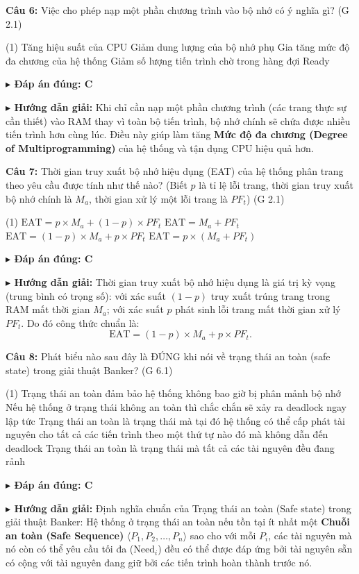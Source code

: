 \documentclass[11pt,a4paper]{article}
\newcommand{\giaithich}[2]{%
    \par\vspace{0.15cm}\noindent
    \begingroup\small
    \noindent\textbf{\color{blue}$\blacktriangleright$ Đáp án đúng: #1} \par\vspace{0.08cm}
    \noindent\textbf{\color{teal}$\blacktriangleright$ Hướng dẫn giải:} #2
    \endgroup\par\vspace{0.35cm}
}
\begin{document}
\noindent\textbf{Câu 6:} Việc cho phép nạp một phần chương trình vào bộ nhớ có ý nghĩa gì? (G 2.1)
\begin{tasks}(1)
    \task Tăng hiệu suất của CPU
    \task Giảm dung lượng của bộ nhớ phụ
    \task Gia tăng mức độ đa chương của hệ thống
    \task Giảm số lượng tiến trình chờ trong hàng đợi Ready
\end{tasks}
\giaithich{C}{Khi chỉ cần nạp một phần chương trình (các trang thực sự cần thiết) vào RAM thay vì toàn bộ tiến trình, bộ nhớ chính sẽ chứa được nhiều tiến trình hơn cùng lúc. Điều này giúp làm tăng \textbf{Mức độ đa chương (Degree of Multiprogramming)} của hệ thống và tận dụng CPU hiệu quả hơn.}

\noindent\textbf{Câu 7:} Thời gian truy xuất bộ nhớ hiệu dụng (EAT) của hệ thống phân trang theo yêu cầu được tính như thế nào? (Biết $p$ là tỉ lệ lỗi trang, thời gian truy xuất bộ nhớ chính là $M_a$, thời gian xử lý một lỗi trang là $PF_t$) (G 2.1)
\begin{tasks}(1)
    \task $\text{EAT} = p \times M_a + (1 - p) \times PF_t$
    \task $\text{EAT} = M_a + PF_t$
    \task $\text{EAT} = (1 - p) \times M_a + p \times PF_t$
    \task $\text{EAT} = p \times (M_a + PF_t)$
\end{tasks}
\giaithich{C}{Thời gian truy xuất bộ nhớ hiệu dụng là giá trị kỳ vọng (trung bình có trọng số): với xác suất $(1 - p)$ truy xuất trúng trang trong RAM mất thời gian $M_a$; với xác suất $p$ phát sinh lỗi trang mất thời gian xử lý $PF_t$. Do đó công thức chuẩn là:
$$\text{EAT} = (1 - p) \times M_a + p \times PF_t.$$}

\noindent\textbf{Câu 8:} Phát biểu nào sau đây là ĐÚNG khi nói về trạng thái an toàn (safe state) trong giải thuật Banker? (G 6.1)
\begin{tasks}(1)
    \task Trạng thái an toàn đảm bảo hệ thống không bao giờ bị phân mảnh bộ nhớ
    \task Nếu hệ thống ở trạng thái không an toàn thì chắc chắn sẽ xảy ra deadlock ngay lập tức
    \task Trạng thái an toàn là trạng thái mà tại đó hệ thống có thể cấp phát tài nguyên cho tất cả các tiến trình theo một thứ tự nào đó mà không dẫn đến deadlock
    \task Trạng thái an toàn là trạng thái mà tất cả các tài nguyên đều đang rảnh
\end{tasks}
\giaithich{C}{Định nghĩa chuẩn của Trạng thái an toàn (Safe state) trong giải thuật Banker: Hệ thống ở trạng thái an toàn nếu tồn tại ít nhất một \textbf{Chuỗi an toàn (Safe Sequence)} $\langle P_1, P_2, \dots, P_n \rangle$ sao cho với mỗi $P_i$, các tài nguyên mà nó còn có thể yêu cầu tối đa ($\text{Need}_i$) đều có thể được đáp ứng bởi tài nguyên sẵn có cộng với tài nguyên đang giữ bởi các tiến trình hoàn thành trước nó.}
\end{document}
